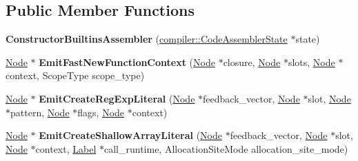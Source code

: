 \subsection*{Public Member Functions}
\begin{DoxyCompactItemize}
\item 
\mbox{\label{classv8_1_1internal_1_1ConstructorBuiltinsAssembler_a87d24ce918ff9eb3a8a9d38b08016bd3}} 
{\bfseries Constructor\+Builtins\+Assembler} (\mbox{\hyperlink{classv8_1_1internal_1_1compiler_1_1CodeAssemblerState}{compiler\+::\+Code\+Assembler\+State}} $\ast$state)
\item 
\mbox{\label{classv8_1_1internal_1_1ConstructorBuiltinsAssembler_acea401d763b25af0ab7016ddac77ef04}} 
\mbox{\hyperlink{classv8_1_1internal_1_1compiler_1_1Node}{Node}} $\ast$ {\bfseries Emit\+Fast\+New\+Function\+Context} (\mbox{\hyperlink{classv8_1_1internal_1_1compiler_1_1Node}{Node}} $\ast$closure, \mbox{\hyperlink{classv8_1_1internal_1_1compiler_1_1Node}{Node}} $\ast$slots, \mbox{\hyperlink{classv8_1_1internal_1_1compiler_1_1Node}{Node}} $\ast$context, Scope\+Type scope\+\_\+type)
\item 
\mbox{\label{classv8_1_1internal_1_1ConstructorBuiltinsAssembler_a064cc56cceda6194c3f114b9fcd2420a}} 
\mbox{\hyperlink{classv8_1_1internal_1_1compiler_1_1Node}{Node}} $\ast$ {\bfseries Emit\+Create\+Reg\+Exp\+Literal} (\mbox{\hyperlink{classv8_1_1internal_1_1compiler_1_1Node}{Node}} $\ast$feedback\+\_\+vector, \mbox{\hyperlink{classv8_1_1internal_1_1compiler_1_1Node}{Node}} $\ast$slot, \mbox{\hyperlink{classv8_1_1internal_1_1compiler_1_1Node}{Node}} $\ast$pattern, \mbox{\hyperlink{classv8_1_1internal_1_1compiler_1_1Node}{Node}} $\ast$flags, \mbox{\hyperlink{classv8_1_1internal_1_1compiler_1_1Node}{Node}} $\ast$context)
\item 
\mbox{\label{classv8_1_1internal_1_1ConstructorBuiltinsAssembler_acc43a980e3c8c7d35f7c096bbcc7de5c}} 
\mbox{\hyperlink{classv8_1_1internal_1_1compiler_1_1Node}{Node}} $\ast$ {\bfseries Emit\+Create\+Shallow\+Array\+Literal} (\mbox{\hyperlink{classv8_1_1internal_1_1compiler_1_1Node}{Node}} $\ast$feedback\+\_\+vector, \mbox{\hyperlink{classv8_1_1internal_1_1compiler_1_1Node}{Node}} $\ast$slot, \mbox{\hyperlink{classv8_1_1internal_1_1compiler_1_1Node}{Node}} $\ast$context, \mbox{\hyperlink{classv8_1_1internal_1_1compiler_1_1CodeAssemblerLabel}{Label}} $\ast$call\+\_\+runtime, Allocation\+Site\+Mode allocation\+\_\+site\+\_\+mode)

\end{DoxyCompactItemize}
